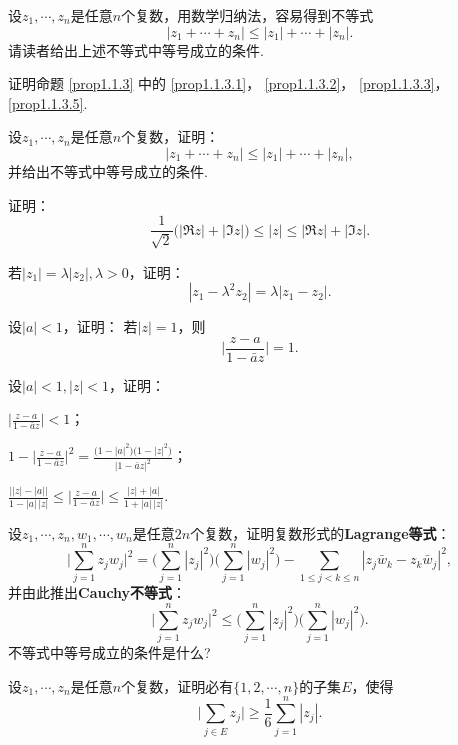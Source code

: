 设$z_1,\cdots,z_n$是任意$n$个复数，用数学归纳法，容易得到不等式
\[|z_1+\cdots+z_n|\le|z_1|+\cdots+|z_n|.\]
请读者给出上述不等式中等号成立的条件.

\begin{xiti}
\item 证明命题 \ref{prop1.1.3} 中的 \ref{prop1.1.3.1}， \ref{prop1.1.3.2}， \ref{prop1.1.3.3}， \ref{prop1.1.3.5}.
\item 设$z_1,\cdots,z_n$是任意$n$个复数，证明：
\[|z_1+\cdots+z_n|\le|z_1|+\cdots+|z_n|,\]
并给出不等式中等号成立的条件.
\item 证明：
\[\frac1{\sqrt2}\bigl(|\Re z|+|\Im z|\bigr)\le |z|\le|\Re z|+|\Im z|.\]
\item 若$|z_1|=\lambda|z_2|,\lambda>0$，证明：
\[|z_1-\lambda^2z_2|=\lambda|z_1-z_2|.\]
\item 设$|a|<1$，证明： 若$|z|=1$，则
\[\bigg|\frac{z-a}{1-\bar az}\bigg|=1.\]
\item 设$|a|<1,|z|<1$，证明：
\begin{enuma}
  \item $\bigg|\frac{z-a}{1-\bar az}\bigg|<1$；
  \item $1-\bigg|\frac{z-a}{1-\bar az}\bigg|^2=\frac{\bigl(1-|a|^2\bigr)\bigl(1-|z|^2\bigr)}{|1-\bar az|^2}$；
  \item $\frac{\bigl||z|-|a|\bigr|}{1-|a|\,|z|}\le\bigg|\frac{z-a}{1-\bar az}\bigg|\le
  \frac{|z|+|a|}{1+|a|\,|z|}$.
\end{enuma}
\item 设$z_1,\cdots,z_n,w_1,\cdots,w_n$是任意$2n$个复数，证明复数形式的\textbf{Lagrange等式}：
\[
\bigg| \sum_{j=1}^n{z_jw_j} \bigg|^2=\bigg( \sum_{j=1}^n{| z_j |^2} \bigg) \bigg( \sum_{j=1}^n{| w_j |^2} \bigg) -\sum_{1\leqslant j<k\leqslant n}{\left| z_j\bar{w}_k-z_k\bar{w}_j \right|^2},
\]
并由此推出\textbf{Cauchy不等式}：
\[
\bigg| \sum_{j=1}^n{z_jw_j} \bigg|^2\leqslant \bigg( \sum_{j=1}^n{| z_j |^2} \bigg) \bigg( \sum_{j=1}^n{| w_j |^2} \bigg).
\]
不等式中等号成立的条件是什么?
\item 设$z_1,\cdots,z_n$是任意$n$个复数，证明必有$\{1,2,\cdots,n\}$的子集$E$，使得
\[
\bigg| \sum_{j\in E}{z_j} \bigg|\geqslant \frac{1}{6}\sum_{j=1}^n{\left| z_j \right|}.
\]

\end{xiti}

